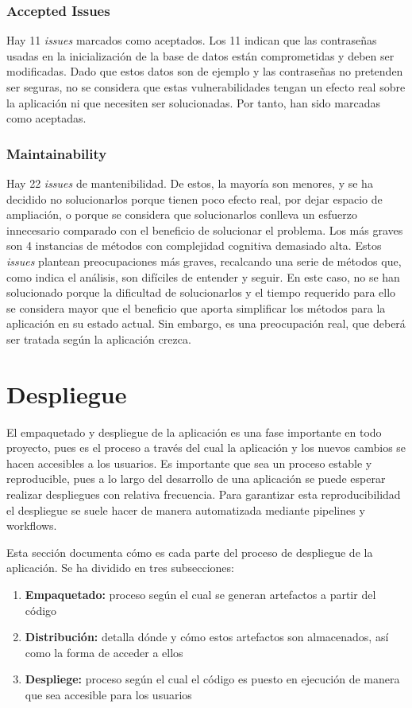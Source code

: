 \subsubsection{Accepted Issues}
Hay 11 \textit{issues} marcados como aceptados. Los 11  indican que las contraseñas usadas en la inicialización de la base de datos están comprometidas y deben ser modificadas. Dado que estos datos son de ejemplo y las contraseñas no pretenden ser seguras, no se considera que estas vulnerabilidades tengan un efecto real sobre la aplicación ni que necesiten ser solucionadas. Por tanto, han sido marcadas como aceptadas.


\subsubsection{Maintainability}
Hay 22 \textit{issues} de mantenibilidad. De estos, la mayoría son menores, y se ha decidido no solucionarlos porque tienen poco efecto real, por dejar espacio de ampliación, o porque se considera que solucionarlos conlleva un esfuerzo innecesario comparado con el beneficio de solucionar el problema. Los más graves son 4 instancias de métodos con complejidad cognitiva demasiado alta. Estos \textit{issues} plantean preocupaciones más graves, recalcando una serie de métodos que, como indica el análisis, son difíciles de entender y seguir. En este caso, no se han solucionado porque la dificultad de solucionarlos y el tiempo requerido para ello se considera mayor que el beneficio que aporta simplificar los métodos para la aplicación en su estado actual. Sin embargo, es una preocupación real, que deberá ser tratada según la aplicación crezca. 

\section{Despliegue}
El empaquetado y despliegue de la aplicación es una fase importante en todo proyecto, pues es el proceso a través del cual la aplicación y los nuevos cambios se hacen accesibles a los usuarios. Es importante que sea un proceso estable y reproducible, pues a lo largo del desarrollo de una aplicación se puede esperar realizar despliegues con relativa frecuencia. Para garantizar esta reproducibilidad el despliegue se suele hacer de manera automatizada mediante pipelines y workflows.

Esta sección documenta cómo es cada parte del proceso de despliegue de la aplicación. Se ha dividido en tres subsecciones:
\begin{enumerate}
    \item \textbf{Empaquetado:} proceso según el cual se generan artefactos a partir del código
    \item \textbf{Distribución:} detalla dónde y cómo estos artefactos son almacenados, así como la forma de acceder a ellos 
    \item \textbf{Despliege:} proceso según el cual el código es puesto en ejecución de manera que sea accesible para los usuarios  
\end{enumerate}


